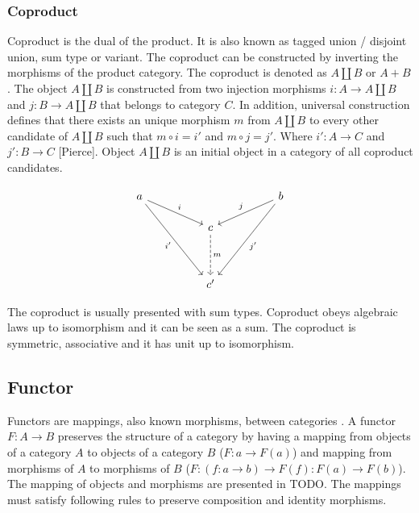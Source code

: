 \documentclass[article]{aaltoseries}
\begin{document}

  \subsubsection{Coproduct}
    Coproduct is the dual of the product. It is also known as tagged union /
    disjoint union, sum type or variant. The coproduct can be constructed by
    inverting the morphisms of the product category. The coproduct is denoted as
    $A \amalg B$ or $A + B$. The object $A \amalg B$ is constructed from two
    injection morphisms $i : A \rightarrow A \amalg B$ and $j : B \rightarrow A
    \amalg B$ that belongs to category $C$. In addition, universal construction
    defines that there exists an unique morphism $m$ from $A \amalg B$ to every
    other candidate of $A \amalg B$ such that $m \circ i = i'$ and $m \circ j =
    j'$. Where $i' : A \rightarrow C$ and $j' : B \rightarrow C$ [Pierce].
    Object $A \amalg B$ is an initial object in a category of all coproduct candidates.

    \[
      \begin{tikzcd}[row sep=huge, column sep=huge]
        a \arrow[dr, "i"]
        \arrow[ddr, "i'"']
        &
        & b \arrow[dl, "j"']
        \arrow[ddl, "j'"] \\
        [-2em] & c \arrow[d, dashed, "m"]
        & \\
        & c'
        &
      \end{tikzcd}
    \]

    The coproduct is usually presented with sum types. Coproduct obeys algebraic
    laws up to isomorphism and it can be seen as a sum. The coproduct is
    symmetric, associative and it has unit up to isomorphism.
    

  \subsection{Functor}
    Functors are mappings, also known morphisms, between categories
    \cite{computational, barr1990category, mac2013categories}. A functor $F: A
    \rightarrow B$ preserves the structure of a category by having a mapping
    from objects of a category $A$ to objects of a category $B$ ($F: a
    \rightarrow F(a)$) and mapping from morphisms of $A$ to morphisms of $B$
    ($F: (f: a \rightarrow b) \rightarrow F(f): F(a) \rightarrow F(b)$). The
    mapping of objects and morphisms are presented in TODO. The mappings must
    satisfy following rules to preserve composition and identity morphisms.
\end{document}

